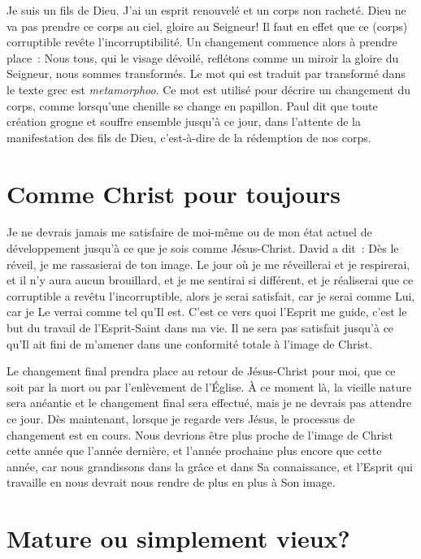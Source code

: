 Je suis un fils de Dieu. J'ai un esprit renouvelé et un corps non racheté.
 Dieu ne va pas prendre ce corps au ciel, gloire au Seigneur!
 \og Il faut en effet que ce (corps) corruptible
 revête l'incorruptibilité. \fg{}
 Un changement commence alors à prendre place~:
 \og Nous tous, qui le visage dévoilé,
 reflétons comme un miroir la gloire du Seigneur,
 nous sommes transformés. \fg{}
 Le mot qui est traduit par \og transformé \fg{}
 dans le texte grec est \emph{metamorphoo}.
 Ce mot est utilisé pour décrire un changement du corps,
 comme lorsqu'une chenille se change en papillon.
 Paul dit que toute création grogne et souffre ensemble
 jusqu'à ce jour, dans l'attente de la manifestation des fils de Dieu,
 c'est-à-dire de la rédemption de nos corps.


\section*{Comme Christ pour toujours}

Je ne devrais jamais me satisfaire de moi-même ou de mon état actuel
 de développement jusqu'à ce que je sois comme Jésus-Christ.
 David a dit~:
 \og Dès le réveil, je me rassasierai de ton image. \fg{}
 Le jour où je me réveillerai et je respirerai,
 et il n'y aura aucun brouillard, et je me sentirai si différent,
 et je réaliserai que ce corruptible a revêtu l'incorruptible,
 alors je serai satisfait, car je serai comme Lui, car je Le verrai
 comme tel qu'Il est. C'est ce vers quoi l'Esprit me guide,
 c'est le but du travail de l'Esprit-Saint dans ma vie.
 Il ne sera pas satisfait jusqu'à ce qu'Il ait fini de m'amener
 dans une conformité totale à l'image de Christ.

Le changement final prendra place au retour de Jésus-Christ pour moi,
 que ce soit par la mort ou par l'enlèvement de l'Église.
 À ce moment là, la vieille nature sera anéantie et le changement final
 sera effectué, mais je ne devrais pas attendre ce jour.
 Dès maintenant, lorsque je regarde vers Jésus, le processus de changement
 est en cours. Nous devrions être plus proche de l'image de Christ
 cette année que l'année dernière, et l'année prochaine plus encore
 que cette année, car nous grandissons dans la grâce et dans Sa connaissance,
 et l'Esprit qui travaille en nous devrait nous rendre
 de plus en plus à Son image.


\section*{Mature ou simplement vieux?}

